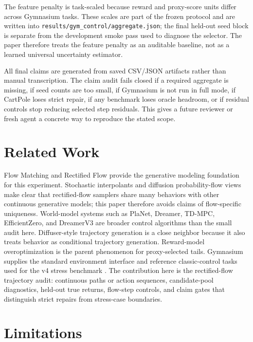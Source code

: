 \documentclass[10pt]{article}
\begin{document}
The feature penalty is task-scaled because reward and proxy-score units differ across Gymnasium tasks. These scales are part of the frozen protocol and are written into \texttt{results/gym\_control/aggregate.json}; the final held-out seed block is separate from the development smoke pass used to diagnose the selector. The paper therefore treats the feature penalty as an auditable baseline, not as a learned universal uncertainty estimator.

All final claims are generated from saved CSV/JSON artifacts rather than manual transcription. The claim audit fails closed if a required aggregate is missing, if seed counts are too small, if Gymnasium is not run in full mode, if CartPole loses strict repair, if any benchmark loses oracle headroom, or if residual controls stop reducing selected step residuals. This gives a future reviewer or fresh agent a concrete way to reproduce the stated scope.

\section{Related Work}

Flow Matching \cite{lipman2023} and Rectified Flow \cite{liu2023} provide the generative modeling foundation for this experiment. Stochastic interpolants and diffusion probability-flow views make clear that rectified-flow samplers share many behaviors with other continuous generative models; this paper therefore avoids claims of flow-specific uniqueness. World-model systems such as PlaNet, Dreamer, TD-MPC, EfficientZero, and DreamerV3 \cite{hafner2023} are broader control algorithms than the small audit here. Diffuser-style trajectory generation \cite{janner2022} is a close neighbor because it also treats behavior as conditional trajectory generation. Reward-model overoptimization \cite{gao2023} is the parent phenomenon for proxy-selected tails. Gymnasium supplies the standard environment interface and reference classic-control tasks used for the v4 stress benchmark \cite{towers2024gymnasium}. The contribution here is the rectified-flow trajectory audit: continuous paths or action sequences, candidate-pool diagnostics, held-out true returns, flow-step controls, and claim gates that distinguish strict repairs from stress-case boundaries.

\section{Limitations}
\end{document}

